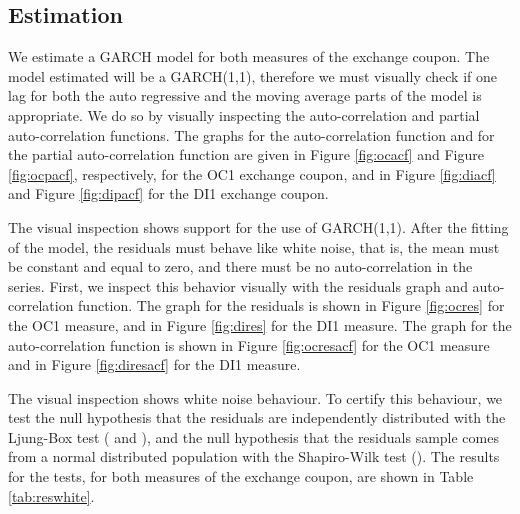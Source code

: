 \documentclass[cic,tc, english]{iiufrgs}
\begin{document}
\subsection{Estimation} \label{chapter_estimation}

    We estimate a GARCH model for both measures of the exchange coupon. The model estimated will be a GARCH(1,1), therefore we must visually check if one lag for both the auto regressive and the moving average parts of the model is appropriate. We do so by visually inspecting the auto-correlation and partial auto-correlation functions. The graphs for the auto-correlation function and for the partial auto-correlation function are given in Figure \ref{fig:ocacf} and Figure \ref{fig:ocpacf}, respectively, for the OC1 exchange coupon, and in Figure \ref{fig:diacf} and Figure \ref{fig:dipacf} for the DI1 exchange coupon.

    

    

    

    

    The visual inspection shows support for the use of GARCH(1,1). After the fitting of the model, the residuals must behave like white noise, that is, the mean must be constant and equal to zero, and there must be no auto-correlation in the series. First, we inspect this behavior visually with the residuals graph and auto-correlation function. The graph for the residuals is shown in Figure \ref{fig:ocres} for the OC1 measure, and in Figure \ref{fig:dires} for the DI1 measure. The graph for the auto-correlation function is shown in Figure \ref{fig:ocresacf} for the OC1 measure and in Figure \ref{fig:diresacf} for the DI1 measure.

    

    

    

    

    The visual inspection shows white noise behaviour. To certify this behaviour, we test the null hypothesis that the residuals are independently distributed with the Ljung-Box test (\citet{boxpierce} and \citet{ljungbox}), and the null hypothesis that the residuals sample comes from a normal distributed population with the Shapiro-Wilk test (\citet{shapirowilk}). The results for the tests, for both measures of the exchange coupon, are shown in Table \ref{tab:reswhite}.
\end{document}
